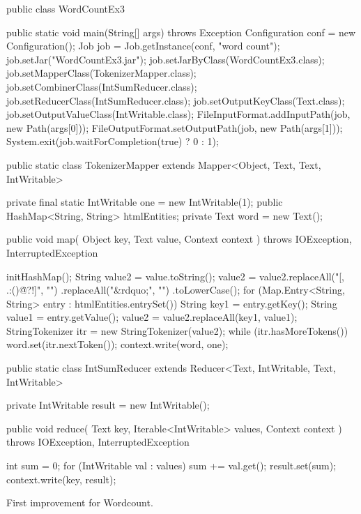 \documentclass[a4paper,11pt]{report}
\begin{document}
\begin{listing}[ht]
\centering
\begin{javacode}
public class WordCountEx3 {

    public static void main(String[] args) throws Exception {
        Configuration conf = new Configuration();
        Job job = Job.getInstance(conf, "word count");
        job.setJar("WordCountEx3.jar");
        job.setJarByClass(WordCountEx3.class);
        job.setMapperClass(TokenizerMapper.class);
        job.setCombinerClass(IntSumReducer.class);
        job.setReducerClass(IntSumReducer.class);
        job.setOutputKeyClass(Text.class);
        job.setOutputValueClass(IntWritable.class);
        FileInputFormat.addInputPath(job, new Path(args[0]));
        FileOutputFormat.setOutputPath(job, new Path(args[1]));
        System.exit(job.waitForCompletion(true) ? 0 : 1);
    }

    public static class TokenizerMapper extends Mapper<Object, Text, Text, IntWritable> {
        private final static IntWritable one = new IntWritable(1);
        public HashMap<String, String> htmlEntities;
        private Text word = new Text();

        public void map(
                Object key,
                Text value,
                Context context
        ) throws IOException, InterruptedException {

            initHashMap();
            String value2 = value.toString();
            value2 = value2.replaceAll("[,\\.:()\"@?!]", "")
                           .replaceAll("&rdquo;", "")
                           .toLowerCase();
            for (Map.Entry<String, String> entry : htmlEntities.entrySet()) {
                String key1 = entry.getKey();
                String value1 = entry.getValue();
                value2 = value2.replaceAll(key1, value1);
            }
            StringTokenizer itr = new StringTokenizer(value2);
            while (itr.hasMoreTokens()) {
                word.set(itr.nextToken());
                context.write(word, one);
            }
        }
    }

    public static class IntSumReducer extends Reducer<Text, IntWritable, Text, IntWritable> {
        private IntWritable result = new IntWritable();

        public void reduce(
                Text key,
                Iterable<IntWritable> values,
                Context context
        ) throws IOException, InterruptedException {

            int sum = 0;
            for (IntWritable val : values) {
                sum += val.get();
            }
            result.set(sum);
            context.write(key, result);
        }
    }
}
\end{javacode}
\caption{First improvement for Wordcount.}
\label{lst:ex3}
\end{listing}
\end{document}
